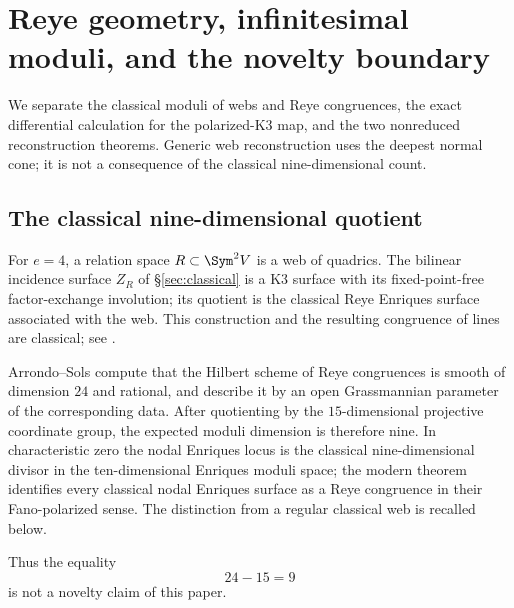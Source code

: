 \section{Reye geometry, infinitesimal moduli, and the novelty boundary}
\label{sec:reye-priority}

We separate the classical moduli of webs and Reye congruences, the
exact differential calculation for the polarized-K3 map, and the two
nonreduced reconstruction theorems.  Generic web reconstruction uses
the deepest normal cone; it is not a consequence of the classical
nine-dimensional count.

\subsection{The classical nine-dimensional quotient}

For $e=4$, a relation space $R\subset\Sym^2V$ is a web of quadrics.
The bilinear incidence surface $Z_R$ of
\S\ref{sec:classical} is a K3 surface with its fixed-point-free
factor-exchange involution; its quotient is the classical Reye
Enriques surface associated with the web.  This construction and the
resulting congruence of lines are classical; see
\cite{Cossec,ArrondoSols,DolgachevReider,IK,DK,MMV}.

Arrondo--Sols compute that the Hilbert scheme of Reye congruences is
smooth of dimension $24$ and rational, and describe it by an open
Grassmannian parameter of the corresponding data.  After quotienting
by the $15$-dimensional projective coordinate group, the expected
moduli dimension is therefore nine.  In characteristic zero the
nodal Enriques locus is the classical nine-dimensional divisor in the
ten-dimensional Enriques moduli space; the modern theorem
\cite{MMV} identifies every classical nodal Enriques surface as a
Reye congruence in their Fano-polarized sense.  The distinction
from a regular classical web is recalled below.

Thus the equality
\[
 24-15=9
\]
is not a novelty claim of this paper.

